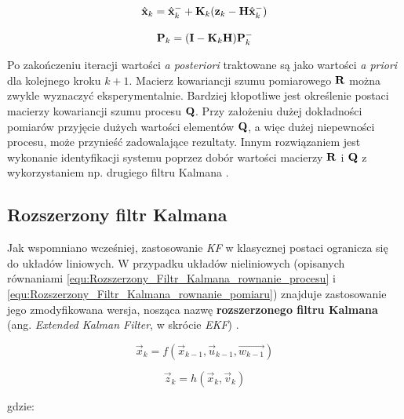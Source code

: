 \begin{equation}
\label{equ:Filtr_Kalmana_faza_korekcji_stan}
	\hat{\mathbf{x}}_k = \hat{\mathbf{x}}_k^- + \mathbf{K}_k(\mathbf{z}_k - \mathbf{H}\hat{\mathbf{x}}_k^-)
\end{equation}

\begin{equation}
\label{equ:Filtr_Kalmana_faza_korekcji_macierz_kowariancji_bledow}
	\mathbf{P}_k = (\mathbf{I} - \mathbf{K}_k \mathbf{H}) \mathbf{P}_k^-
\end{equation}

Po zakończeniu iteracji wartości \textit{a posteriori} traktowane są jako wartości \textit{a priori} dla kolejnego kroku $k+1$. Macierz kowariancji szumu pomiarowego $\mathbf{R}$ można zwykle wyznaczyć eksperymentalnie. Bardziej kłopotliwe jest określenie postaci macierzy kowariancji szumu procesu $\mathbf{Q}$. Przy założeniu dużej dokładności pomiarów przyjęcie dużych wartości elementów $\mathbf{Q}$, a więc dużej niepewności procesu, może przynieść zadowalające rezultaty. Innym rozwiązaniem jest wykonanie identyfikacji systemu poprzez dobór wartości macierzy $\mathbf{R}$ i $\mathbf{Q}$ z wykorzystaniem np. drugiego filtru Kalmana \cite{Welch1995}.

\subsection{Rozszerzony filtr Kalmana}
\label{subsec:Rozszerzony_filtr_Kalmana}

Jak wspomniano wcześniej, zastosowanie \textit{KF} w klasycznej postaci ogranicza się do układów liniowych. W przypadku układów nieliniowych (opisanych równaniami \ref{equ:Rozszerzony_Filtr_Kalmana_rownanie_procesu} i \ref{equ:Rozszerzony_Filtr_Kalmana_rownanie_pomiaru}) znajduje zastosowanie jego zmodyfikowana wersja, nosząca nazwę \textbf{rozszerzonego filtru Kalmana} (ang. \textit{Extended Kalman Filter}, w skrócie \textit{EKF}) \cite{Welch1995}.

\begin{equation}
\label{equ:Rozszerzony_Filtr_Kalmana_rownanie_procesu}
	\vec{x}_k = f(\vec{x}_{k-1}, \vec{u}_{k-1}, \vec{w_{k-1}})
\end{equation}

\begin{equation}
\label{equ:Rozszerzony_Filtr_Kalmana_rownanie_pomiaru}
	\vec{z}_k = h(\vec{x}_k, \vec{v}_k)
\end{equation}

\noindent
gdzie:

